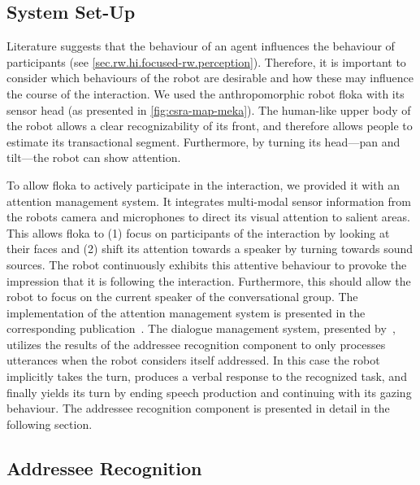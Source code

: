 \subsection{System Set-Up}
Literature suggests that the behaviour of an agent influences the behaviour of participants (see \cref{sec.rw.hi.focused-rw.perception}).
Therefore, it is important to consider which behaviours of the \gls{robot} are desirable and how these may influence the course of the interaction.
We used the anthropomorphic \gls{robot} \gls{floka} with its sensor head (as presented in \vref{fig:csra-map-meka}).
The human-like upper body of the \gls{robot} allows a clear recognizability of its front, and therefore allows people to estimate its \gls{transactional segment}.
Furthermore, by turning its head---pan and tilt---the \gls{robot} can show attention. 

To allow \gls{floka} to actively participate in the interaction, we provided it with an attention management system.
It integrates multi-modal sensor information from the \glspl{robot} camera and microphones to direct its visual attention to salient areas.
This allows \gls{floka} to (1) focus on participants of the interaction by looking at their faces and (2) shift its attention towards a \gls{speaker} by turning towards sound sources.
The \gls{robot} continuously exhibits this attentive behaviour to provoke the impression that it is following the interaction.
Furthermore, this should allow the \gls{robot} to focus on the current \gls{speaker} of the \gls{conversational group}.
The implementation of the attention management system is presented in the corresponding publication~\cite{Richter}.
The dialogue management system, presented by~, utilizes the results of the \gls{addressee} recognition component to only processes utterances when the \gls{robot} considers itself addressed.
In this case the \gls{robot} implicitly takes the \gls{turn}, produces a verbal response to the recognized task, and finally yields its \gls{turn} by ending speech production and continuing with its gazing behaviour.
The \gls{addressee} recognition component is presented in detail in the following section.

\subsection{Addressee Recognition}\label{sec.meka.study.classifiers}

